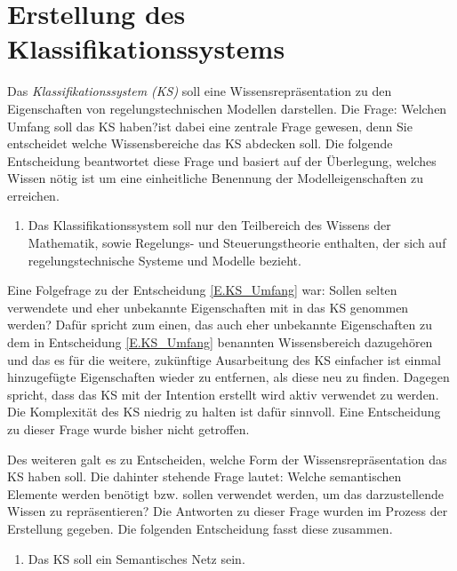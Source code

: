 \section{Erstellung des Klassifikationssystems}
\label{Ch:Vorbetrachtung:Sec:KS}
Das \textit{Klassifikationssystem (KS)} soll eine Wissensrepräsentation zu den Eigenschaften von regelungstechnischen Modellen darstellen. 
Die Frage: \glqq Welchen Umfang soll das KS haben?\grqq ist dabei eine zentrale Frage gewesen, denn Sie entscheidet welche Wissensbereiche das KS abdecken soll. Die folgende Entscheidung beantwortet diese Frage und basiert auf der Überlegung, welches Wissen nötig ist um eine einheitliche Benennung der Modelleigenschaften zu erreichen. 
\begin{enumerate}[resume*]
	\item \label{E.KS_Umfang}Das Klassifikationssystem soll nur den Teilbereich des Wissens der Mathematik, sowie Regelungs- und Steuerungstheorie enthalten, der sich auf regelungstechnische Systeme und Modelle bezieht.
\end{enumerate}

Eine Folgefrage zu der Entscheidung \ref{E.KS_Umfang} war: Sollen selten verwendete und eher unbekannte Eigenschaften mit in das KS genommen werden? Dafür spricht zum einen, das auch eher unbekannte Eigenschaften zu dem in Entscheidung \ref{E.KS_Umfang} benannten Wissensbereich dazugehören und das es für die weitere, zukünftige Ausarbeitung des KS einfacher ist einmal hinzugefügte Eigenschaften wieder zu entfernen, als diese neu zu finden. Dagegen spricht, dass das KS mit der Intention erstellt wird aktiv verwendet zu werden. Die Komplexität des KS niedrig zu halten ist dafür sinnvoll. Eine Entscheidung zu dieser Frage wurde bisher nicht getroffen.

Des weiteren galt es zu Entscheiden, welche Form der Wissensrepräsentation das KS haben soll. Die dahinter stehende Frage lautet: Welche semantischen Elemente werden benötigt bzw. sollen verwendet werden, um das darzustellende Wissen zu repräsentieren? Die Antworten zu dieser Frage wurden im Prozess der Erstellung gegeben. Die folgenden Entscheidung fasst diese zusammen.
\begin{enumerate}[resume*]
	\item \label{E.KS_SemantischesNetz}Das KS soll ein Semantisches Netz sein. %
\end{enumerate}


